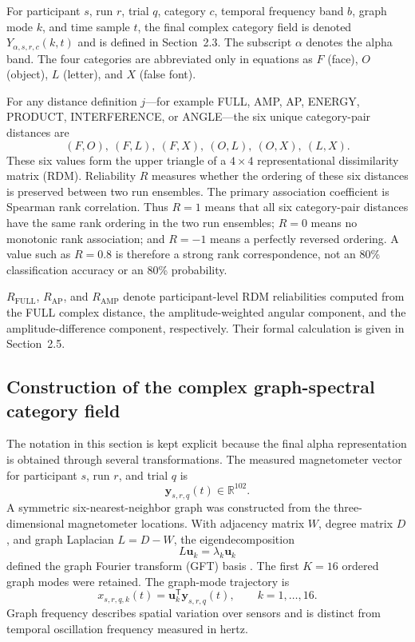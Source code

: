 \documentclass[11pt]{article}
\begin{document}
For participant $s$, run $r$, trial $q$, category $c$, temporal frequency band $b$, graph mode $k$, and time sample $t$, the final complex category field is denoted $Y_{\alpha,s,r,c}(k,t)$ and is defined in Section~2.3. The subscript $\alpha$ denotes the alpha band. The four categories are abbreviated only in equations as $F$ (face), $O$ (object), $L$ (letter), and $X$ (false font).

For any distance definition $j$---for example FULL, AMP, AP, ENERGY, PRODUCT, INTERFERENCE, or ANGLE---the six unique category-pair distances are
\begin{equation}
(F,O),\ (F,L),\ (F,X),\ (O,L),\ (O,X),\ (L,X).
\label{eq:sixpairs}
\end{equation}
These six values form the upper triangle of a $4\times4$ representational dissimilarity matrix (RDM). Reliability $R$ measures whether the ordering of these six distances is preserved between two run ensembles. The primary association coefficient is Spearman rank correlation. Thus $R=1$ means that all six category-pair distances have the same rank ordering in the two run ensembles; $R=0$ means no monotonic rank association; and $R=-1$ means a perfectly reversed ordering. A value such as $R=0.8$ is therefore a strong rank correspondence, not an 80\% classification accuracy or an 80\% probability.

$R_{\mathrm{FULL}}$, $R_{\mathrm{AP}}$, and $R_{\mathrm{AMP}}$ denote participant-level RDM reliabilities computed from the FULL complex distance, the amplitude-weighted angular component, and the amplitude-difference component, respectively. Their formal calculation is given in Section~2.5.

\subsection{Construction of the complex graph-spectral category field}
The notation in this section is kept explicit because the final alpha representation is obtained through several transformations. The measured magnetometer vector for participant $s$, run $r$, and trial $q$ is
\begin{equation}
\bm y_{s,r,q}(t)\in\mathbb R^{102}.
\end{equation}
A symmetric six-nearest-neighbor graph was constructed from the three-dimensional magnetometer locations. With adjacency matrix $W$, degree matrix $D$, and graph Laplacian $L=D-W$, the eigendecomposition
\begin{equation}
L\bm u_k=\lambda_k\bm u_k
\end{equation}
defined the graph Fourier transform (GFT) basis \citep{Shuman2013,Huang2018}. The first $K=16$ ordered graph modes were retained. The graph-mode trajectory is
\begin{equation}
x_{s,r,q,k}(t)=\bm u_k^{\mathsf T}\bm y_{s,r,q}(t),\qquad k=1,\ldots,16.
\label{eq:gft}
\end{equation}
Graph frequency describes spatial variation over sensors and is distinct from temporal oscillation frequency measured in hertz.
\end{document}
